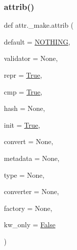 \subsubsection{\texorpdfstring{attrib()}{attrib()}}
{\footnotesize\ttfamily def attr.\+\_\+make.\+attrib (\begin{DoxyParamCaption}\item[{}]{default = {\ttfamily \hyperlink{namespaceattr_1_1__make_a4b0e597eb2f1bb453e7502bf9e1ec615}{N\+O\+T\+H\+I\+NG}},  }\item[{}]{validator = {\ttfamily None},  }\item[{}]{repr = {\ttfamily \hyperlink{namespaceattr_1_1__make_a2574ed57c67459b7e6bcc4e40da338f3}{True}},  }\item[{}]{cmp = {\ttfamily \hyperlink{namespaceattr_1_1__make_a2574ed57c67459b7e6bcc4e40da338f3}{True}},  }\item[{}]{hash = {\ttfamily None},  }\item[{}]{init = {\ttfamily \hyperlink{namespaceattr_1_1__make_a2574ed57c67459b7e6bcc4e40da338f3}{True}},  }\item[{}]{convert = {\ttfamily None},  }\item[{}]{metadata = {\ttfamily None},  }\item[{}]{type = {\ttfamily None},  }\item[{}]{converter = {\ttfamily None},  }\item[{}]{factory = {\ttfamily None},  }\item[{}]{kw\+\_\+only = {\ttfamily \hyperlink{namespaceattr_1_1__make_a65fcd916433aa9a30f9711503366982e}{False}} }\end{DoxyParamCaption})}


